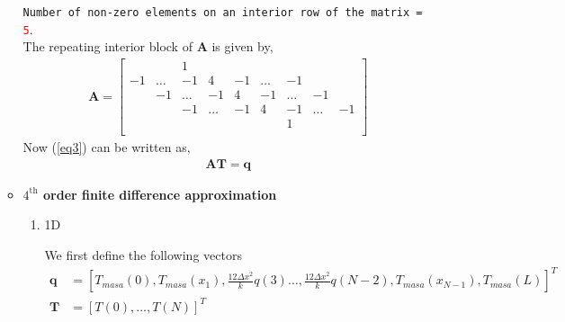 \documentclass[12 pt, final]{article}
\begin{document}
\begin{itemize}
\begin{itemize}
            \texttt{Number of non-zero elements on an interior row of the matrix = \textcolor{red}{5}}.\\  

            The repeating interior block of $\mathbf{A}$ is given by,
                    \begin{align*}
                    \mathbf{A} = \left[\begin{smallmatrix}
                    &&1\\ -1&\hdots&-1&4&-1&\hdots&-1\\
                     &-1&\hdots&-1&4&-1&\hdots&-1\\
                     &&-1&\hdots&-1&4&-1&\hdots&-1\\
                    &&&&&&1\\
                    \end{smallmatrix}\right]
                \end{align*}
            Now (\ref{eq3}) can be written as,
                \begin{align*}
                    \mathbf{AT} = \mathbf{q}
                \end{align*}
            \item  \textbf{$4^{\text{th}}$ order finite difference approximation}
            \begin{enumerate}
                \item 1D
                
                We first define the following vectors
                \begin{align*}
                    \mathbf{q} &= \left[T_{masa}(0) ,T_{masa}(x_1),\frac{12\Delta x^2}{k}q(3) \hdots,\frac{12\Delta x^2}{k}q(N-2), T_{masa}(x_{N-1}),T_{masa}(L)\right]^T\\
                    \mathbf{T} &= [T(0) ,\hdots, T(N)]^T
                \end{align*}
                

\end{enumerate}
\end{itemize}
\end{itemize}
\end{document}
